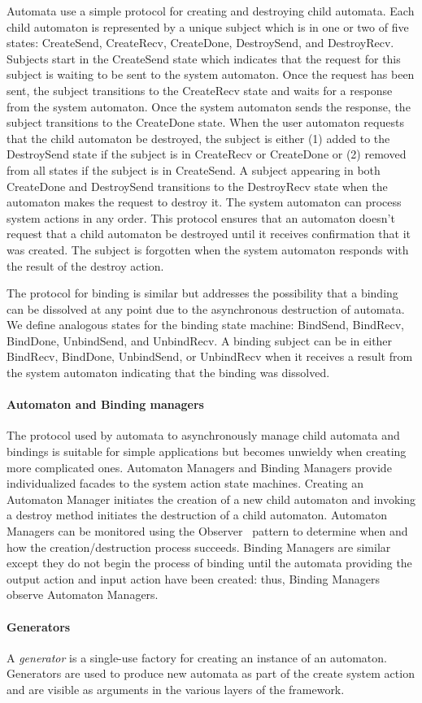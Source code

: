 Automata use a simple protocol for creating and destroying child automata.
Each child automaton is represented by a unique subject which is in one or two of five states: CreateSend, CreateRecv, CreateDone, DestroySend, and DestroyRecv.
Subjects start in the CreateSend state which indicates that the request for this subject is waiting to be sent to the system automaton.
Once the request has been sent, the subject transitions to the CreateRecv state and waits for a response from the system automaton.
Once the system automaton sends the response, the subject transitions to the CreateDone state.
When the user automaton requests that the child automaton be destroyed, the subject is either (1) added to the DestroySend state if the subject is in CreateRecv or CreateDone or (2) removed from all states if the subject is in CreateSend.
A subject appearing in both CreateDone and DestroySend transitions to the DestroyRecv state when the automaton makes the request to destroy it.
The system automaton can process system actions in any order.
This protocol ensures that an automaton doesn't request that a child automaton be destroyed until it receives confirmation that it was created.
The subject is forgotten when the system automaton responds with the result of the destroy action.

The protocol for binding is similar but addresses the possibility that a binding can be dissolved at any point due to the asynchronous destruction of automata.
We define analogous states for the binding state machine: BindSend, BindRecv, BindDone, UnbindSend, and UnbindRecv.
A binding subject can be in either BindRecv, BindDone, UnbindSend, or UnbindRecv when it receives a result from the system automaton indicating that the binding was dissolved.

\paragraph*{Automaton and Binding managers}
The protocol used by automata to asynchronously manage child automata and bindings is suitable for simple applications but becomes unwieldy when creating more complicated ones.
Automaton Managers and Binding Managers provide individualized facades to the system action state machines.
Creating an Automaton Manager initiates the creation of a new child automaton and invoking a destroy method initiates the destruction of a child automaton.
Automaton Managers can be monitored using the Observer~\cite{gamma1995design} pattern to determine when and how the creation/destruction process succeeds.
Binding Managers are similar except they do not begin the process of binding until the automata providing the output action and input action have been created: thus, Binding Managers observe Automaton Managers.

\paragraph*{Generators}
A \emph{generator} is a single-use factory for creating an instance of an automaton.
Generators are used to produce new automata as part of the create system action and are visible as arguments in the various layers of the framework.
